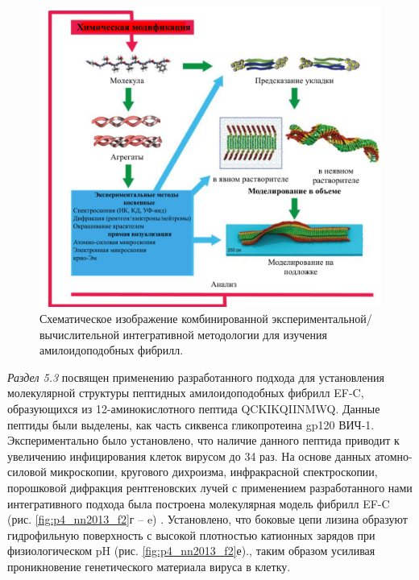 \begin{figure} [H]
    \centering
    \includegraphics[width=\textwidth]{images/p4/punkt5/part4_p5_f54.pdf}
    \caption[Схематическое изображение комбинированной экспериментальной/вычислительной интегративной методологии для изучения амилоидоподобных фибрилл]{Схематическое изображение комбинированной экспериментальной/вычислительной интегративной методологии для изучения амилоидоподобных фибрилл.}
    \label{fig:p4_p5_f54}
\end{figure}


\textit{Раздел 5.3} посвящен применению разработанного подхода для установления молекулярной структуры пептидных амилоидоподобных фибрилл EF-C, образующихся из 12-аминокислотного пептида QCKIKQIINMWQ. Данные пептиды были выделены, как часть сиквенса гликопротеина gp120 ВИЧ-1. Экспериментально было установлено, что наличие данного пептида приводит к увеличению инфицирования клеток вирусом до 34 раз. На основе данных атомно-силовой микроскопии, кругового дихроизма, инфракрасной спектроскопии, порошковой дифракция рентгеновских лучей с применением разработанного нами интегративного подхода была построена молекулярная модель фибрилл EF-C (рис. \ref{fig:p4_nn2013_f2}г – e) \cite{yolamanova_peptide_2013}. Установлено, что боковые цепи лизина образуют гидрофильную поверхность с высокой плотностью катионных зарядов при физиологическом pH (рис. \ref{fig:p4_nn2013_f2}е)., таким образом усиливая проникновение генетического материала вируса в клетку.
    
